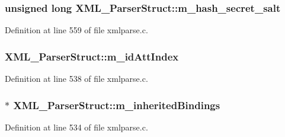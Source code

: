 \subsubsection[{\texorpdfstring{m\+\_\+hash\+\_\+secret\+\_\+salt}{m_hash_secret_salt}}]{\setlength{\rightskip}{0pt plus 5cm}unsigned long X\+M\+L\+\_\+\+Parser\+Struct\+::m\+\_\+hash\+\_\+secret\+\_\+salt}\hypertarget{struct_x_m_l___parser_struct_a66c0dc32de442b691f5c1f63db64ca19}{}\label{struct_x_m_l___parser_struct_a66c0dc32de442b691f5c1f63db64ca19}


Definition at line 559 of file xmlparse.\+c.

\subsubsection[{\texorpdfstring{m\+\_\+id\+Att\+Index}{m_idAttIndex}}]{ X\+M\+L\+\_\+\+Parser\+Struct\+::m\+\_\+id\+Att\+Index}\hypertarget{struct_x_m_l___parser_struct_a55ab4b27ecd23410bb85341e6aaf3928}{}\label{struct_x_m_l___parser_struct_a55ab4b27ecd23410bb85341e6aaf3928}


Definition at line 538 of file xmlparse.\+c.

\subsubsection[{\texorpdfstring{m\+\_\+inherited\+Bindings}{m_inheritedBindings}}]{$\ast$ X\+M\+L\+\_\+\+Parser\+Struct\+::m\+\_\+inherited\+Bindings}\hypertarget{struct_x_m_l___parser_struct_aa772e4820abf55d0a9b5d4a6c41283c7}{}\label{struct_x_m_l___parser_struct_aa772e4820abf55d0a9b5d4a6c41283c7}


Definition at line 534 of file xmlparse.\+c.

